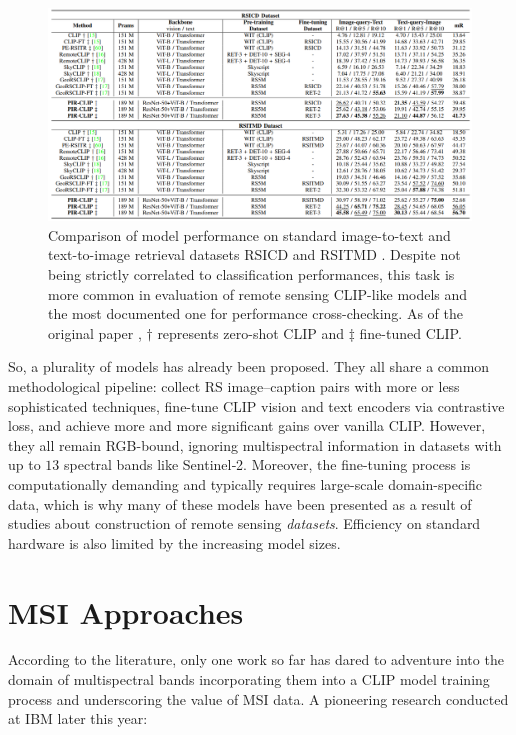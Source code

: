 \documentclass[a4paper, oneside, english]{sapthesis} %
\begin{document}
\begin{figure}[h]
    \centering
    \includegraphics[width=\textwidth]{img/PIRCLIP_summary_results.png}
    \caption{Comparison of model performance on standard image-to-text and text-to-image retrieval datasets RSICD \cite{lu2017exploring} and RSITMD \cite{yuan2022exploring}. Despite not being strictly correlated to classification performances, this task is more common in evaluation of remote sensing CLIP-like models and the most documented one for performance cross-checking. As of the original paper \cite{pan2024pir}, $\dagger$ represents zero-shot CLIP and $\ddagger$ fine-tuned CLIP.}
    \label{fig:pirclip}
\end{figure}


So, a plurality of models has already been proposed. They all share a common methodological pipeline: collect RS image–caption pairs with more or less sophisticated techniques, fine-tune CLIP vision and text encoders via contrastive loss, and achieve more and more significant gains over vanilla CLIP. However, they all remain RGB-bound, ignoring multispectral information in datasets with up to $13$ spectral bands like Sentinel‑2. Moreover, the fine-tuning process is computationally demanding and typically requires large-scale domain-specific data, which is why many of these models have been presented as a result of studies about construction of remote sensing \emph{datasets}. Efficiency on standard hardware is also limited by the increasing model sizes.


\section{MSI Approaches}

According to the literature, only one work so far has dared to adventure into the domain of multispectral bands incorporating them into a CLIP model training process and underscoring the value of MSI data. A pioneering research conducted at IBM later this year: 
\end{document}
